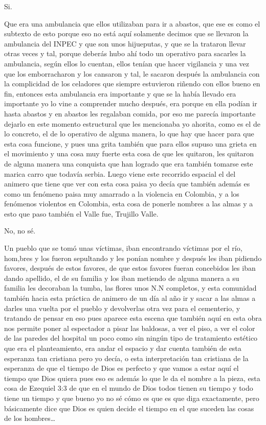 Si.

Que era una ambulancia que ellos utilizaban para ir a abastos, que ese es como el subtexto de esto porque eso no está aquí solamente decimos que se llevaron la ambulancia del INPEC y que son unos hijueputas, y que se la trataron llevar otras veces y tal, porque deberás hubo ahí todo un operativo para sacarles la ambulancia, según ellos lo cuentan, ellos tenían que hacer vigilancia y una vez que los emborracharon y los cansaron y tal, le sacaron después la ambulancia con la complicidad de los celadores que siempre estuvieron riñendo con ellos bueno en fin, entonces esta ambulancia era importante y que se la había llevado era importante yo lo vine a comprender mucho después, era porque en ella podían ir hasta abastos y en abastos les regalaban comida, por eso me parecía importante dejarlo en este momento estructural que les mencionaba yo ahorita, como es el de lo concreto, el de lo operativo de alguna manera, lo que hay que hacer para que esta cosa funcione, y pues una grita también que para ellos supuso una grieta en el movimiento y una cosa muy fuerte esta cosa de que les quitaron, les quitaron de alguna manera una conquista que han logrado que era también tomarse este marica carro que todavía serbia.
Luego viene este recorrido espacial el del animero que tiene que ver con esta cosa paisa yo decía que también además es como un fenómeno paisa muy amarrado a la violencia en Colombia, y a los fenómenos violentos en Colombia, esta cosa de ponerle nombres a las almas y a esto que paso también el Valle fue, Trujillo Valle.

No, no sé.

Un pueblo que se tomó unas víctimas, iban encontrando víctimas por el río, hom,bres y los fueron sepultando y les ponían nombre y después les iban pidiendo favores, después de estos favores, de que estos favores fueran concebidos les iban dando apellido, el de su familia y los iban metiendo de alguna manera a su familia les decoraban la tumba, las flores unos N.N completos, y esta comunidad también hacia esta práctica de animero de un día al año ir y sacar a las almas a darles una vuelta por el pueblo y devolverlas otra vez para el cementerio, y tratando de pensar en eso pues aparece esta escena que también aquí en esta obra nos permite poner al espectador  a pisar las baldosas, a ver el piso, a ver el color de las paredes del hospital un poco como sin ningún tipo de  tratamiento estético que era el planteamiento, era andar el espacio y dar cuenta también de esta esperanza tan cristiana pero yo decía, o esta interpretación tan cristiana de la esperanza de que el tiempo de Dios es perfecto y que vamos a estar aquí el tiempo que Dios quiera pues eso es además lo que le da el nombre a la pieza, esta cosa de Ezequiel 3:3 de que en el mundo de Dios todos tienen su tiempo y todo tiene un tiempo y que bueno yo no sé cómo es que es que diga exactamente, pero básicamente dice que Dios es quien decide el tiempo en el que suceden las cosas de los hombres…

